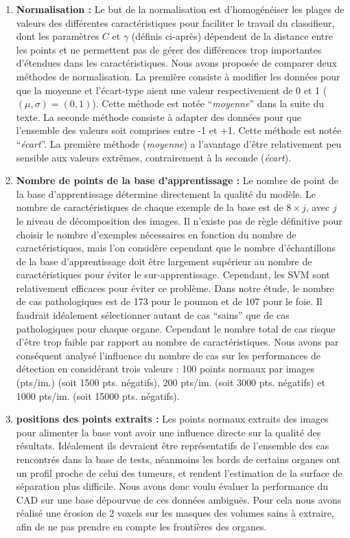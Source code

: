 \begin{enumerate}
 \item \textbf{Normalisation :} Le but de la normalisation est d'homogénéiser les plages de valeurs des différentes caractéristiques pour faciliter le travail du classifieur, dont les paramètres $C$ et $\gamma$ (définis ci-après) dépendent de la distance entre les points et ne permettent pas de gérer des différences trop importantes d'étendues dans les caractéristiques.  Nous avons proposée de comparer deux méthodes de normalisation. La première consiste à modifier les données pour que la moyenne et l'écart-type aient une valeur respectivement de 0 et 1 ($(\mu, \sigma)=(0,1)$). Cette méthode est notée ``\emph{moyenne}'' dans la suite du texte. La seconde méthode consiste à adapter des données pour que l'ensemble des valeurs soit comprises entre -1 et +1. Cette méthode est notée ``\emph{écart}''. La première méthode (\emph{moyenne}) a l'avantage d'être relativement peu sensible aux valeurs extrêmes, contrairement à la seconde (\emph{écart}).


 \item \textbf{Nombre de points de la base d'apprentissage :} Le nombre de point de la base d'apprentissage détermine directement la qualité du modèle. Le nombre de caractéristiques de chaque exemple de la base est de $8 \times j$, avec $j$ le niveau de décomposition des images. Il n'existe pas de règle définitive pour choisir le nombre d'exemples nécessaires en fonction du nombre de caractéristiques, mais l'on considère cependant que le nombre d'échantillons de la base d'apprentissage doit être largement supérieur au nombre de caractéristiques pour éviter le sur-apprentissage. Cependant, les SVM sont relativement efficaces pour éviter ce problème. Dans notre étude, le nombre de cas pathologiques est de 173 pour le poumon et de 107 pour le foie. Il faudrait idéalement sélectionner autant de cas ``sains'' que de cas pathologiques pour chaque organe. Cependant le nombre total de cas risque d'être trop faible par rapport au nombre de caractéristiques. Nous avons par conséquent analysé l'influence du nombre de cas sur les performances de détection en considérant trois valeurs : 100 points normaux par images (pts/im.) (soit 1500 pts. négatifs), 200 pts/im. (soit 3000 pts. négatifs) et 1000 pts/im. (soit 15000 pts. négatifs).


 \item \textbf{positions des points extraits :} Les points normaux extraits des images pour alimenter la base vont avoir une influence directe sur la qualité des résultats. Idéalement ils devraient être représentatifs de l'ensemble des cas rencontrés dans la base de tests, néanmoins les bords de certains organes ont un profil proche de celui des tumeurs, et rendent l'estimation de la surface de séparation plus difficile. Nous avons donc voulu évaluer la performance du CAD sur une base dépourvue de ces données ambiguës. Pour cela nous avons réalisé une érosion de 2 voxels sur les masques des volumes sains à extraire, afin de ne pas prendre en compte les frontières des organes.
\end{enumerate}




